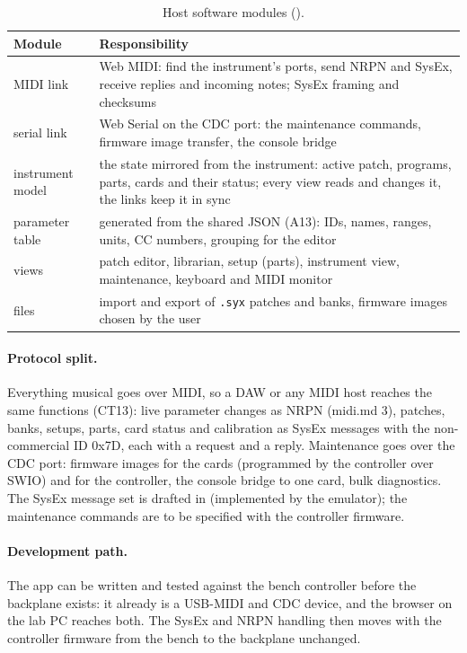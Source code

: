 \begin{table}[htbp]
\centering\small
\caption{Host software modules ().}\label{tab:sadhs}
\begin{tabularx}{\textwidth}{@{}l X@{}}
\toprule
Module & Responsibility \\
\midrule
MIDI link & Web MIDI: find the instrument's ports, send NRPN and SysEx, receive replies and incoming notes; SysEx
  framing and checksums \\
serial link & Web Serial on the CDC port: the maintenance commands, firmware image transfer, the console bridge \\
instrument model & the state mirrored from the instrument: active patch, programs, parts, cards and their status;
  every view reads and changes it, the links keep it in sync \\
parameter table & generated from the shared JSON (A13): IDs, names, ranges, units, CC numbers, grouping for the
  editor \\
views & patch editor, librarian, setup (parts), instrument view, maintenance, keyboard and MIDI monitor \\
files & import and export of \texttt{.syx} patches and banks, firmware images chosen by the user \\
\bottomrule
\end{tabularx}
\end{table}

\paragraph{Protocol split.} Everything musical goes over MIDI, so a DAW or any MIDI host reaches the same functions
(CT13): live parameter changes as NRPN (midi.md 3), patches, banks, setups, parts, card status and calibration as
SysEx messages with the non-commercial ID 0x7D, each with a request and a reply. Maintenance goes over the CDC port:
firmware images for the cards (programmed by the controller over SWIO) and for the controller, the console bridge
to one card, bulk diagnostics. The SysEx message set is drafted in  (implemented by the
emulator); the maintenance commands are to be specified with the controller firmware.

\paragraph{Development path.} The app can be written and tested against the bench controller before the backplane
exists: it already is a USB-MIDI and CDC device, and the browser on the lab PC reaches both. The SysEx and NRPN
handling then moves with the controller firmware from the bench to the backplane unchanged.

